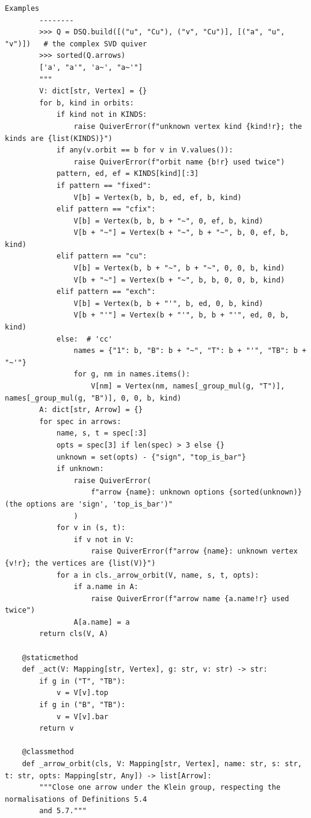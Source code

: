 \documentclass[12pt, a4paper]{report}
\theoremstyle{plain}
\theoremstyle{definition}
\theoremstyle{remark}
\theoremstyle{plain}
\begin{document}
\begin{lstlisting}[style=dsqcode]
        Examples
        --------
        >>> Q = DSQ.build([("u", "Cu"), ("v", "Cu")], [("a", "u", "v")])   # the complex SVD quiver
        >>> sorted(Q.arrows)
        ['a', "a'", 'a~', "a~'"]
        """
        V: dict[str, Vertex] = {}
        for b, kind in orbits:
            if kind not in KINDS:
                raise QuiverError(f"unknown vertex kind {kind!r}; the kinds are {list(KINDS)}")
            if any(v.orbit == b for v in V.values()):
                raise QuiverError(f"orbit name {b!r} used twice")
            pattern, ed, ef = KINDS[kind][:3]
            if pattern == "fixed":
                V[b] = Vertex(b, b, b, ed, ef, b, kind)
            elif pattern == "cfix":
                V[b] = Vertex(b, b, b + "~", 0, ef, b, kind)
                V[b + "~"] = Vertex(b + "~", b + "~", b, 0, ef, b, kind)
            elif pattern == "cu":
                V[b] = Vertex(b, b + "~", b + "~", 0, 0, b, kind)
                V[b + "~"] = Vertex(b + "~", b, b, 0, 0, b, kind)
            elif pattern == "exch":
                V[b] = Vertex(b, b + "'", b, ed, 0, b, kind)
                V[b + "'"] = Vertex(b + "'", b, b + "'", ed, 0, b, kind)
            else:  # 'cc'
                names = {"1": b, "B": b + "~", "T": b + "'", "TB": b + "~'"}
                for g, nm in names.items():
                    V[nm] = Vertex(nm, names[_group_mul(g, "T")], names[_group_mul(g, "B")], 0, 0, b, kind)
        A: dict[str, Arrow] = {}
        for spec in arrows:
            name, s, t = spec[:3]
            opts = spec[3] if len(spec) > 3 else {}
            unknown = set(opts) - {"sign", "top_is_bar"}
            if unknown:
                raise QuiverError(
                    f"arrow {name}: unknown options {sorted(unknown)} (the options are 'sign', 'top_is_bar')"
                )
            for v in (s, t):
                if v not in V:
                    raise QuiverError(f"arrow {name}: unknown vertex {v!r}; the vertices are {list(V)}")
            for a in cls._arrow_orbit(V, name, s, t, opts):
                if a.name in A:
                    raise QuiverError(f"arrow name {a.name!r} used twice")
                A[a.name] = a
        return cls(V, A)

    @staticmethod
    def _act(V: Mapping[str, Vertex], g: str, v: str) -> str:
        if g in ("T", "TB"):
            v = V[v].top
        if g in ("B", "TB"):
            v = V[v].bar
        return v

    @classmethod
    def _arrow_orbit(cls, V: Mapping[str, Vertex], name: str, s: str, t: str, opts: Mapping[str, Any]) -> list[Arrow]:
        """Close one arrow under the Klein group, respecting the normalisations of Definitions 5.4
        and 5.7."""


\end{lstlisting}
\end{document}
